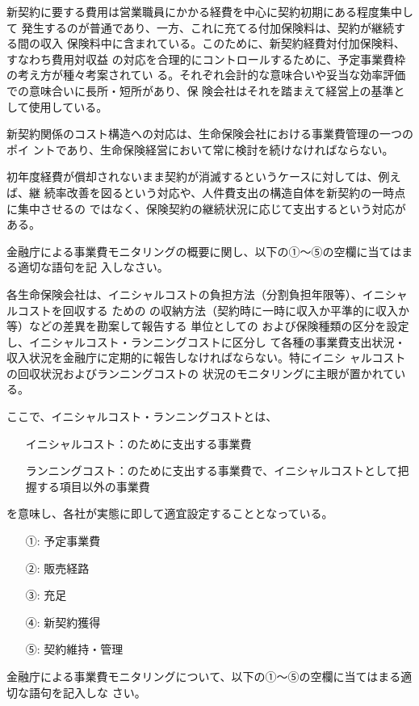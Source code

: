 \documentclass[report,gutter=10mm,fore-edge=10mm,uplatex,dvipdfmx]{jlreq}
\begin{document}
新契約に要する費用は営業職員にかかる経費を中心に契約初期にある程度集中して
発生するのが普通であり、一方、これに充てる付加保険料は、契約が継続する間の収入
保険料中に含まれている。このために、新契約経費対付加保険料、すなわち費用対収益
の対応を合理的にコントロールするために、予定事業費枠の考え方が種々考案されてい
る。それぞれ会計的な意味合いや妥当な効率評価での意味合いに長所・短所があり、保
険会社はそれを踏まえて経営上の基準として使用している。

新契約関係のコスト構造への対応は、生命保険会社における事業費管理の一つのポイ
ントであり、生命保険経営において常に検討を続けなければならない。

初年度経費が償却されないまま契約が消滅するというケースに対しては、例えば、継
続率改善を図るという対応や、人件費支出の構造自体を新契約の一時点に集中させるの
ではなく、保険契約の継続状況に応じて支出するという対応がある。

金融庁による事業費モニタリングの概要に関し、以下の①～⑤の空欄に当てはまる適切な語句を記
入しなさい。

各生命保険会社は、イニシャルコストの負担方法（分割負担年限等）、イニシャルコストを回収する
ための
の収納方法（契約時に一時に収入か平準的に収入か等）などの差異を勘案して報告する
単位としての
および保険種類の区分を設定し、イニシャルコスト・ランニングコストに区分し
て各種の事業費支出状況・
収入状況を金融庁に定期的に報告しなければならない。特にイニシ
ャルコストの回収状況およびランニングコストの
状況のモニタリングに主眼が置かれている。

ここで、イニシャルコスト・ランニングコストとは、
\begin{itemize}
\item[]  イニシャルコスト：のために支出する事業費
\item[]  ランニングコスト：のために支出する事業費で、イニシャルコストとして把握する項目以外の事業費
\end{itemize}
を意味し、各社が実態に即して適宜設定することとなっている。
\answer{}
\begin{itemize}
\item[①: ] 予定事業費
\item[②: ] 販売経路
\item[③: ] 充足
\item[④: ] 新契約獲得
\item[⑤: ] 契約維持・管理
\end{itemize}

金融庁による事業費モニタリングについて、以下の①～⑤の空欄に当てはまる適切な語句を記入しな
さい。
\end{document}
